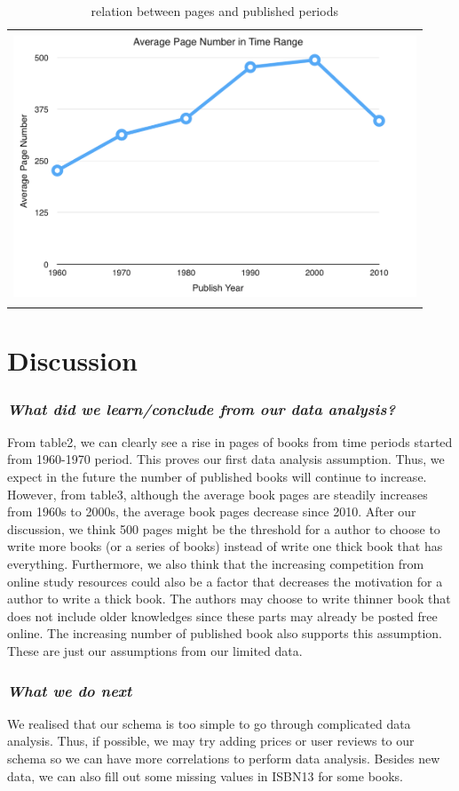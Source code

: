 \documentclass[10pt, oneside]{article}
\begin{document}
\begin{table}[H]
\centering
\begin{tabular}{c}
\includegraphics[width=12cm, height=8cm]{average}
\end{tabular}
\caption{relation between pages and published periods}
\end{table}

\section*{Discussion}
\subsubsection*{\textit{What did we learn/conclude from our data analysis?  }}
From table2, we can clearly see a rise in pages of books from time periods started from 1960-1970 period. This proves our first data analysis assumption. Thus, we expect in the future the number of published books will continue to increase. However, from table3, although the average book pages are steadily increases from 1960s to 2000s, the average book pages decrease since 2010. After our discussion, we think 500 pages might be the threshold for a author to choose to write more books (or a series of books) instead of write one thick book that has everything. Furthermore, we also think that the increasing competition from online study resources could also be a factor that decreases the motivation for a author to write a thick book. The authors may choose to write thinner book that does not include older knowledges since these parts may already be posted free online. The increasing number of published book also supports this assumption.  These are just our assumptions from our limited data.

\subsubsection*{\textit{What we do next}}
We realised that our schema is too simple to go through complicated data analysis. Thus, if possible, we may try adding prices or user reviews to our schema so we can have more correlations to perform data analysis. Besides new data, we can also fill out some missing values in ISBN13 for some books. 
\end{document}
